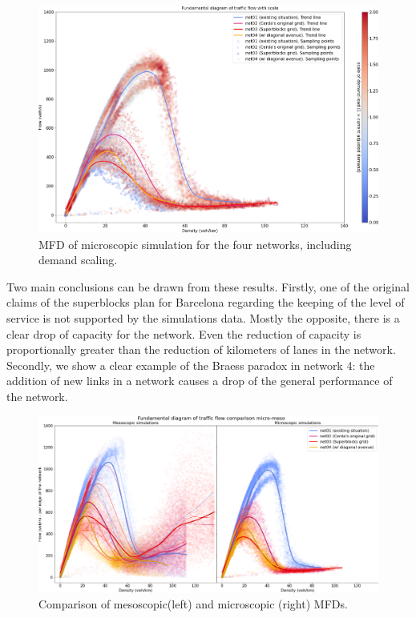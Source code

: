 \documentclass[11pt]{article}
\begin{document}
\begin{figure}[htbp!]
\centering
\includegraphics[width=\textwidth]{code/simulations/charts/MFD02_compar_01-02-03-04_micro.png}
\caption{MFD of microscopic simulation for the four networks, including demand scaling.}
\label{fig:MFD of microscopic simulation for the four proposed networks.}
\end{figure}

Two main conclusions can be drawn from these results. Firstly, one of the original claims of the superblocks plan for Barcelona regarding the keeping of the level of service \citep{Rueda2018} is not supported by the simulations data. Mostly the opposite, there is a clear drop of capacity for the network. Even the reduction of capacity is proportionally greater than the reduction of kilometers of lanes in the network.
Secondly, we show a clear example of the Braess paradox in network 4: the addition of new links in a network causes a drop of the general performance of the network.  

\begin{figure}[htbp!]
\centering
\includegraphics[width=\textwidth]{code/simulations/charts/MFD01_compar_micro-meso.png}
\caption{Comparison of mesoscopic\footnotemark (left) and microscopic (right) MFDs.}
\label{fig:MFD-comp-micro-meso.}
\end{figure}
\end{document}
